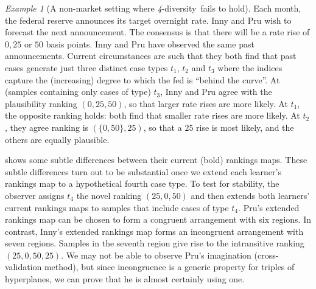 \documentclass[ecta,nameyear,draft]{econsocart}
\newcommand{\fourdiv}{\textit{4}-\textup{diversity}}
\newcommand{\threediv}{\textit{3}-\textup{diversity}}
\theoremstyle{plain}
\theoremstyle{remark}
\newtheorem{example}{Example}%
\begin{document}
\begin{example}[A non-market setting where \fourdiv\ fails to hold]
  \label{eg-rates} Each month, the federal reserve announces its target
  overnight rate.  Inny and {Pru} wish to forecast the next announcement. The
  consensus is that there will be a rate rise of ${0}, {25}$ or ${50}$ basis
  points.  Inny and {Pru} have observed the same past announcements.  Current
  circumstances are such that they both find that past cases generate just
  three distinct case types $t_1$, $t_2$ and $t_3$ where the indices capture
  the (increasing) degree to which the fed is ``behind the curve''.  At
  (samples containing only cases of type) $t_3$, Inny and {Pru} agree with the
  plausibility ranking $\left({0}, {25}, {50}\right)$, so that larger rate
  rises are more likely.  At $t_1$, the opposite ranking holds: both find that
  smaller rate rises are more likely. At $t_2$, they agree ranking is
  $\left(\{{0}, {50}\}, {25}\right)$, so that a ${25}$ rise is most likely, and
  the others are equally plausible. 
 
   shows some subtle differences between their current (bold)
  rankings maps.  These subtle differences turn out to be substantial once we
  extend each learner's rankings map to a hypothetical fourth case type.  To
  test for stability, the observer assigns $t_4$ the novel ranking $\left({25},
  {0}, {50}\right)$ and then extends both learners' current rankings maps to
  samples that include cases of type $t_4$.  {Pru}'s extended rankings map can
  be chosen to form a congruent arrangement with six regions. In contrast,
  Inny's extended rankings map forms an incongruent arrangement with seven
  regions.  Samples in the seventh region give rise to the intransitive ranking
  $\left({25}, {0}, {50}, {25}\right)$.
  We may not be able to observe {Pru}'s imagination (cross-validation method),
  but since incongruence is a generic property for triples of hyperplanes, we
  can prove that he is almost certainly using one.
\end{example}
\end{document}
